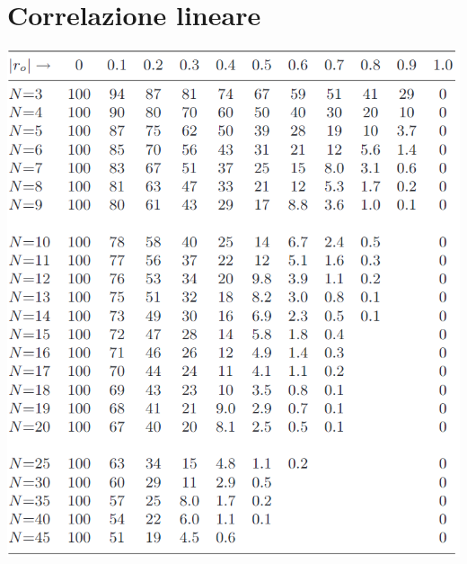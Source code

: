 \documentclass[11pt]{article}
\begin{document}
    \section{Correlazione lineare}
    \vspace*{\fill}
    \begin{minipage}{0.99\textwidth}
        \centering
        \includegraphics[width = .9\textwidth]{img/tab_r}
    \end{minipage}
    \vspace*{\fill}
\end{document}
